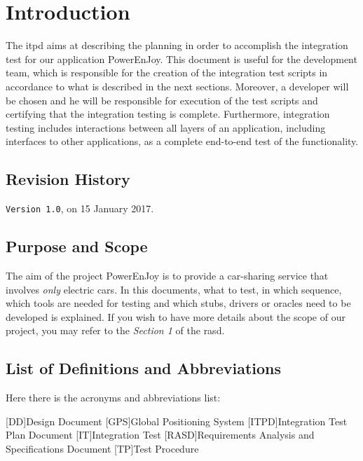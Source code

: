 \section{Introduction} \label{sec:intro}

The \acl{itpd} aims at describing the planning in order to accomplish the integration test for our application PowerEnJoy. 
This document is useful for the development team, which is responsible for the creation of the integration test scripts in accordance to what is described in the next sections. Moreover, a developer will be chosen and he will be responsible for execution of the test scripts and certifying that the integration testing is complete. Furthermore, integration testing includes interactions between all layers of an application, including interfaces to other applications, as a complete end-to-end test of the functionality. 

\subsection{Revision History}
\texttt{Version 1.0}, on 15 January 2017.

\subsection{Purpose and Scope}
The aim of the project PowerEnJoy is to provide a car-sharing service that involves \textit{only} electric cars. In this documents, what to test, in which sequence, which tools are needed for testing and which stubs, drivers or oracles need to be developed is explained. If you wish to have more details about the scope of our project, you may refer to the \textit{Section 1} of the \acl{rasd}.

\subsection{List of Definitions and Abbreviations}
Here there is the acronyms and abbreviations list:

\begin{acronym}[DD] %

[DD]{Design Document}
[GPS]{Global Positioning System}
[ITPD]{Integration Test Plan Document}
[IT]{Integration Test}
[RASD]{Requirements Analysis and Specifications Document}
[TP]{Test Procedure}

\end{acronym}

